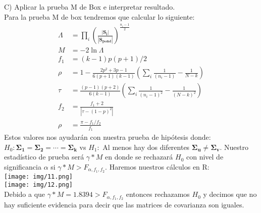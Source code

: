 \begin{sol}
\pagebreak

C) Aplicar la prueba M de Box e interpretar resultado.\\
Para la prueba M de box tendremos que calcular lo siguiente:
\begin{align*}
\Lambda &= \prod_{i}(\frac{|\bm{S_i}|}{|\bm{S_{pond}}|})^{\frac{n_i-1}{2}}  \\
M &= -2\ln{\Lambda}\\
f_1 &= (k-1)p(p+1)/2\\
\rho &= 1- \frac{2p^2+3p-1}{6(p+1)(k-1)}(\sum_i\frac{1}{(n_i-1)}-\frac{1}{N-k})\\
\tau &= \frac{(p-1)(p+2)}{6(k-1)}(\sum_i\frac{1}{(n_i-1)^2}-\frac{1}{(N-k)^2})\\
f_2 &= \frac{f_1+2}{|\tau-(1-p)^2|}\\
\rho &= \frac{\pi-f_1/f_2}{f_1}
\end{align*}
Estos valores nos ayudarán con nuestra prueba de hipótesis donde: $H_0:\bm{\Sigma_1=\Sigma_2=\cdots = \Sigma_k}$ vs $H_1:$ Al menos hay dos diferentes $\bm{\Sigma_u} \neq \bm{\Sigma_v}$. Nuestro estadístico de prueba será $\gamma* M$ en donde se rechazará $H_0$ con nivel de significancia $\alpha$ si $\gamma*M>F_{\alpha,f_1,f_2}$. Haremos nuestros cálculos en R:\\
\texttt{[image: img/11.png]}\\
\texttt{[image: img/12.png]}\\
Debido a que $\gamma* M = 1.8394 > F_{\alpha,f_1,f_2}$ entonces rechazamos $H_0$ y decimos que no hay suficiente evidencia para decir que las matrices de covarianza son iguales.
\end{sol}